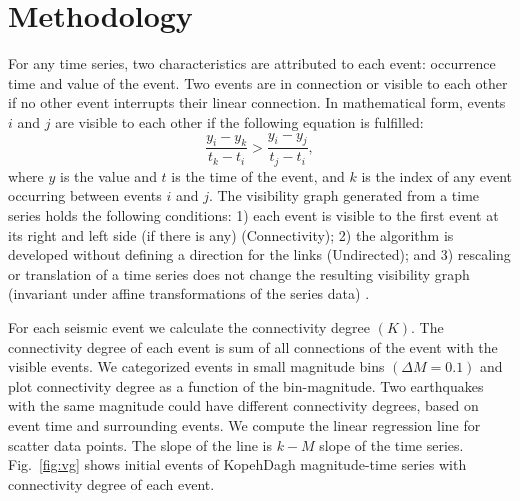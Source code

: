 
\section{Methodology}

For any time series, two characteristics are attributed to each event: occurrence time and value of the event. Two events are in connection or visible to each other if no other event interrupts their linear connection. In mathematical form, events $i$ and $j$ are visible to each other if the following equation is fulfilled:
%
\begin{equation}
\frac{y_i - y_k }{t_k - t_i} > \frac{y_i - y_j}{ t_j - t_i} ,
\end{equation}
%
\noindent
where $y$ is the value and $t$ is the time of the event, and $k$ is the index of any event occurring between events  $i$  and  $j$. The visibility graph generated from a time series holds the following conditions: 1) each event is visible to the first event at its right and left side (if there is any) (Connectivity); 2) the algorithm is developed without defining a direction for the links (Undirected); and 3) rescaling or translation of a time series does not change the resulting visibility graph (invariant under affine transformations of the series data) \citep{Lacasa2008}. 

For each seismic event we calculate the connectivity degree $(K)$. The connectivity degree of each event is sum of all connections of the event with the visible events. We categorized events in small magnitude bins $(\Delta M=0.1)$ and plot connectivity degree as a function of the bin-magnitude. Two earthquakes with the same magnitude could have different connectivity degrees, based on event time and surrounding events. We compute the linear regression line for scatter data points. The slope of the line is $k-M$ slope of the time series. Fig.~\ref{fig:vg} shows initial events of KopehDagh magnitude-time series with connectivity degree of each event. 

